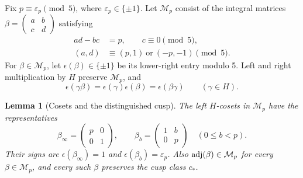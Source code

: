 \documentclass[11pt,a4paper]{article}
\newtheorem{lemma}[theorem]{Lemma}
\theoremstyle{definition}\newtheorem{definition}[theorem]{Definition}
\theoremstyle{remark}\newtheorem{remark}[theorem]{Remark}
\numberwithin{equation}{section}
\begin{document}
Fix \(p\equiv\varepsilon_p\pmod5\), where
\(\varepsilon_p\in\{\pm1\}\).  Let \(\mathcal M_p\) consist of
the integral matrices \(\beta=\left(\begin{smallmatrix}a&b\\c&d\end{smallmatrix}\right)\)
satisfying
\[
 \begin{aligned}
 ad-bc&=p,\qquad c\equiv0\pmod5,\\
 (a,d)&\equiv(p,1)\ \text{or}\ (-p,-1)\pmod5.
 \end{aligned}
\]
For \(\beta\in\mathcal M_p\), let \(\epsilon(\beta)\in\{\pm1\}\)
be its lower-right entry modulo 5.  Left and right multiplication
by \(H\) preserve \(\mathcal M_p\), and
\[
 \epsilon(\gamma\beta)=\epsilon(\gamma)\epsilon(\beta)
                    =\epsilon(\beta\gamma)
 \qquad(\gamma\in H).
\]

\begin{lemma}[Cosets and the distinguished cusp]\label{E:lem:zagier-hecke}
The left \(H\)-cosets in \(\mathcal M_p\) have the representatives
\[
 \beta_\infty=\begin{pmatrix}p&0\\0&1\end{pmatrix},\qquad
 \beta_b=\begin{pmatrix}1&b\\0&p\end{pmatrix}\quad(0\le b<p).
\]
Their signs are
\(\epsilon(\beta_\infty)=1\) and
\(\epsilon(\beta_b)=\varepsilon_p\).
Also \({\rm adj}(\beta)\in\mathcal M_p\) for every
\(\beta\in\mathcal M_p\), and every such \(\beta\) preserves
the cusp class \(c_*\).
\end{lemma}
\end{document}
